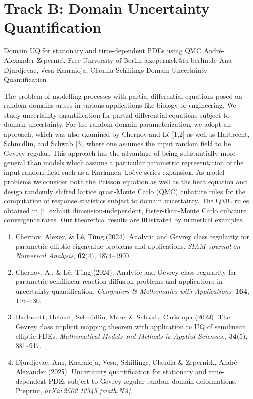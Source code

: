 \section{Track B: Domain Uncertainty Quantification}\newpage

\begin{talk}
  {Domain UQ for stationary and time-dependent PDEs using QMC}%
  {Andr\'e-Alexander Zepernick}%
  {Free University of Berlin}%
  {a.zepernick@fu-berlin.de}%
  {Ana Djurdjevac, Vesa Kaarnioja, Claudia Schillings}%
  {Domain Uncertainty Quantification}%

The problem of modelling processes with partial differential equations posed on random domains arises in various applications like biology or engineering. We study uncertainty quantification for partial differential equations subject to domain uncertainty. For the random domain parameterization, we adopt an approach, which was also examined by Chernov and L\^{e} [1,2] as well as Harbrecht, Schmidlin, and Schwab [3], where one assumes the input random field to be Gevrey regular. This approach has the advantage of being substantially more general than models which assume a particular parametric representation of the input random field such as a Karhunen--Lo\`eve series expansion. As model problems we consider both the Poisson equation as well as the heat equation and design randomly shifted lattice quasi-Monte Carlo (QMC) cubature rules for the computation of response statistics subject to domain uncertainty. The QMC rules obtained in [4] exhibit dimension-independent, faster-than-Monte Carlo cubature convergence rates. Our theoretical results are illustrated by numerical examples.
\begin{enumerate}
    \item[{[1]}] Chernov, Alexey, \& L\^{e}, T\`ung (2024). Analytic and Gevrey class regularity for parametric elliptic eigenvalue problems and applications. \emph{SIAM Journal on Numerical Analysis}, \textbf{62}(4), 1874--1900.
    \item[{[2]}] Chernov, A., \& L\^{e}, T\`ung (2024). Analytic and Gevrey class regularity for parametric semilinear reaction-diffusion problems and applications in uncertainty quantification. \emph{Computers \& Mathematics with Applications}, \textbf{164}, 116--130.
    \item[{[3]}] Harbrecht, Helmut, Schmidlin, Marc, \& Schwab, Christoph (2024). The Gevrey class implicit mapping theorem with application to UQ of semilinear elliptic PDEs. \emph{Mathematical Models and Methods in Applied Sciences.}, \textbf{34}(5), 881--917.
    \item[{[4]}] Djurdjevac, Ana, Kaarnioja, Vesa, Schillings, Claudia \& Zepernick, Andr\'e-Alexander (2025). Uncertainty quantification for stationary and time-dependent PDEs subject to Gevrey regular random domain deformations. Preprint, \emph{arXiv:2502.12345 [math.NA]}.
\end{enumerate}

\medskip

\end{talk}

